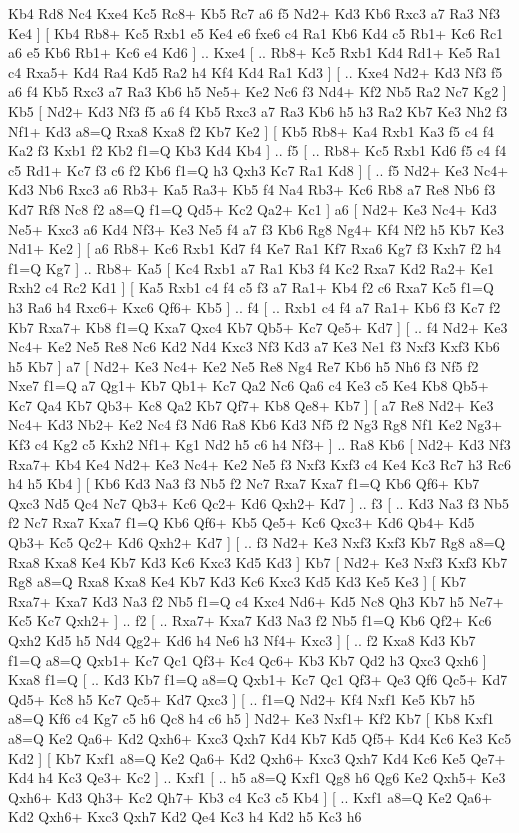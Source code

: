 Kb4 Rd8  Nc4 Kxe4  Kc5 Rc8+  Kb5 Rc7  a6 f5  Nd2+ Kd3  Kb6 Rxc3  a7 Ra3  Nf3 Ke4   ]  [  Kb4 Rb8+  Kc5 Rxb1  e5 Ke4  e6 fxe6  c4 Ra1  Kb6 Kd4  c5 Rb1+  Kc6 Rc1  a6 e5  Kb6 Rb1+  Kc6 e4  Kd6   ] .. Kxe4 [ .. Rb8+  Kc5 Rxb1  Kd4 Rd1+  Ke5 Ra1  c4 Rxa5+  Kd4 Ra4  Kd5 Ra2  h4 Kf4  Kd4 Ra1  Kd3   ]  [ .. Kxe4  Nd2+ Kd3  Nf3 f5  a6 f4  Kb5 Rxc3  a7 Ra3  Kb6 h5  Ne5+ Ke2  Nc6 f3  Nd4+ Kf2  Nb5 Ra2  Nc7 Kg2   ]  Kb5 [  Nd2+ Kd3  Nf3 f5  a6 f4  Kb5 Rxc3  a7 Ra3  Kb6 h5  h3 Ra2  Kb7 Ke3  Nh2 f3  Nf1+ Kd3  a8=Q Rxa8  Kxa8 f2  Kb7 Ke2   ]  [  Kb5 Rb8+  Ka4 Rxb1  Ka3 f5  c4 f4  Ka2 f3  Kxb1 f2  Kb2 f1=Q  Kb3 Kd4  Kb4   ] .. f5 [ .. Rb8+  Kc5 Rxb1  Kd6 f5  c4 f4  c5 Rd1+  Kc7 f3  c6 f2  Kb6 f1=Q  h3 Qxh3  Kc7 Ra1  Kd8   ]  [ .. f5  Nd2+ Ke3  Nc4+ Kd3  Nb6 Rxc3  a6 Rb3+  Ka5 Ra3+  Kb5 f4  Na4 Rb3+  Kc6 Rb8  a7 Re8  Nb6 f3  Kd7 Rf8  Nc8 f2  a8=Q f1=Q  Qd5+ Kc2  Qa2+ Kc1   ]  a6 [  Nd2+ Ke3  Nc4+ Kd3  Ne5+ Kxc3  a6 Kd4  Nf3+ Ke3  Ne5 f4  a7 f3  Kb6 Rg8  Ng4+ Kf4  Nf2 h5  Kb7 Ke3  Nd1+ Ke2   ]  [  a6 Rb8+  Kc6 Rxb1  Kd7 f4  Ke7 Ra1  Kf7 Rxa6  Kg7 f3  Kxh7 f2  h4 f1=Q  Kg7   ] .. Rb8+    Ka5 [  Kc4 Rxb1  a7 Ra1  Kb3 f4  Kc2 Rxa7  Kd2 Ra2+  Ke1 Rxh2  c4 Rc2  Kd1   ]  [  Ka5 Rxb1  c4 f4  c5 f3  a7 Ra1+  Kb4 f2  c6 Rxa7  Kc5 f1=Q  h3 Ra6  h4 Rxc6+  Kxc6 Qf6+  Kb5   ] .. f4 [ .. Rxb1  c4 f4  a7 Ra1+  Kb6 f3  Kc7 f2  Kb7 Rxa7+  Kb8 f1=Q  Kxa7 Qxc4  Kb7 Qb5+  Kc7 Qe5+  Kd7   ]  [ .. f4  Nd2+ Ke3  Nc4+ Ke2  Ne5 Re8  Nc6 Kd2  Nd4 Kxc3  Nf3 Kd3  a7 Ke3  Ne1 f3  Nxf3 Kxf3  Kb6 h5  Kb7   ]  a7 [  Nd2+ Ke3  Nc4+ Ke2  Ne5 Re8  Ng4 Re7  Kb6 h5  Nh6 f3  Nf5 f2  Nxe7 f1=Q  a7 Qg1+  Kb7 Qb1+  Kc7 Qa2  Nc6 Qa6  c4 Ke3  c5 Ke4  Kb8 Qb5+  Kc7 Qa4  Kb7 Qb3+  Kc8 Qa2  Kb7 Qf7+  Kb8 Qe8+  Kb7   ]  [  a7 Re8  Nd2+ Ke3  Nc4+ Kd3  Nb2+ Ke2  Nc4 f3  Nd6 Ra8  Kb6 Kd3  Nf5 f2  Ng3 Rg8  Nf1 Ke2  Ng3+ Kf3  c4 Kg2  c5 Kxh2  Nf1+ Kg1  Nd2 h5  c6 h4  Nf3+   ] .. Ra8    Kb6 [  Nd2+ Kd3  Nf3 Rxa7+  Kb4 Ke4  Nd2+ Ke3  Nc4+ Ke2  Ne5 f3  Nxf3 Kxf3  c4 Ke4  Kc3 Rc7  h3 Rc6  h4 h5  Kb4   ]  [  Kb6 Kd3  Na3 f3  Nb5 f2  Nc7 Rxa7  Kxa7 f1=Q  Kb6 Qf6+  Kb7 Qxc3  Nd5 Qc4  Nc7 Qb3+  Kc6 Qc2+  Kd6 Qxh2+  Kd7   ] .. f3 [ .. Kd3  Na3 f3  Nb5 f2  Nc7 Rxa7  Kxa7 f1=Q  Kb6 Qf6+  Kb5 Qe5+  Kc6 Qxc3+  Kd6 Qb4+  Kd5 Qb3+  Kc5 Qc2+  Kd6 Qxh2+  Kd7   ]  [ .. f3  Nd2+ Ke3  Nxf3 Kxf3  Kb7 Rg8  a8=Q Rxa8  Kxa8 Ke4  Kb7 Kd3  Kc6 Kxc3  Kd5 Kd3   ]  Kb7 [  Nd2+ Ke3  Nxf3 Kxf3  Kb7 Rg8  a8=Q Rxa8  Kxa8 Ke4  Kb7 Kd3  Kc6 Kxc3  Kd5 Kd3  Ke5 Ke3   ]  [  Kb7 Rxa7+  Kxa7 Kd3  Na3 f2  Nb5 f1=Q  c4 Kxc4  Nd6+ Kd5  Nc8 Qh3  Kb7 h5  Ne7+ Kc5  Kc7 Qxh2+   ] .. f2 [ .. Rxa7+  Kxa7 Kd3  Na3 f2  Nb5 f1=Q  Kb6 Qf2+  Kc6 Qxh2  Kd5 h5  Nd4 Qg2+  Kd6 h4  Ne6 h3  Nf4+ Kxc3   ]  [ .. f2  Kxa8 Kd3  Kb7 f1=Q  a8=Q Qxb1+  Kc7 Qc1  Qf3+ Kc4  Qc6+ Kb3  Kb7 Qd2  h3 Qxc3  Qxh6   ]  Kxa8   f1=Q [ .. Kd3  Kb7 f1=Q  a8=Q Qxb1+  Kc7 Qc1  Qf3+ Qe3  Qf6 Qc5+  Kd7 Qd5+  Kc8 h5  Kc7 Qc5+  Kd7 Qxc3   ]  [ .. f1=Q  Nd2+ Kf4  Nxf1 Ke5  Kb7 h5  a8=Q Kf6  c4 Kg7  c5 h6  Qc8 h4  c6 h5   ]  Nd2+   Ke3    Nxf1+   Kf2    Kb7 [  Kb8 Kxf1  a8=Q Ke2  Qa6+ Kd2  Qxh6+ Kxc3  Qxh7 Kd4  Kb7 Kd5  Qf5+ Kd4  Kc6 Ke3  Kc5 Kd2   ]  [  Kb7 Kxf1  a8=Q Ke2  Qa6+ Kd2  Qxh6+ Kxc3  Qxh7 Kd4  Kc6 Ke5  Qe7+ Kd4  h4 Kc3  Qe3+ Kc2   ] .. Kxf1 [ .. h5  a8=Q Kxf1  Qg8 h6  Qg6 Ke2  Qxh5+ Ke3  Qxh6+ Kd3  Qh3+ Kc2  Qh7+ Kb3  c4 Kc3  c5 Kb4   ]  [ .. Kxf1  a8=Q Ke2  Qa6+ Kd2  Qxh6+ Kxc3  Qxh7 Kd2  Qe4 Kc3  h4 Kd2  h5 Kc3  h6 
